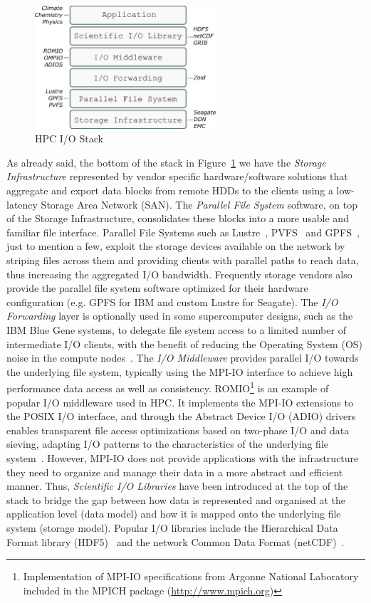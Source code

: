 \begin{figure}[!htb]
  \centering
  \includegraphics[width=0.6\textwidth]{chapters/figures/hpc-io-stack}
  \caption{HPC I/O Stack}
  \label{figure: hpc-io-stack}
\end{figure}

As already said, the bottom of the stack in Figure~\ref{figure: hpc-io-stack} we have the \textit{Storage Infrastructure} represented by vendor specific hardware/software solutions that aggregate
and export data blocks from remote HDDs to the clients using a low-latency Storage Area Network (SAN). The \textit{Parallel File System} software, on top of the Storage Infrastructure, 
consolidates these blocks into a more usable and familiar file interface. Parallel File Systems such as Lustre~\cite{Braam02}, PVFS~\cite{CarnsLRT} and GPFS~\cite{SchmuckH02}, 
just to mention a few, exploit the storage devices available on the network by striping files across them and providing clients with parallel paths to reach data, thus increasing the 
aggregated I/O bandwidth. Frequently storage vendors also provide the parallel file system software optimized for their hardware configuration (e.g. GPFS for IBM and custom Lustre for Seagate). 
The \textit{I/O Forwarding} layer is optionally used in some supercomputer designs, such as the IBM Blue Gene systems, to delegate file system access to a limited number of intermediate I/O clients, 
with the benefit of reducing the Operating System (OS) noise in the compute nodes~\cite{AliCIKLLRWS09}. The \textit{I/O Middleware} provides parallel I/O towards the underlying file system, typically 
using the MPI-IO interface to achieve high performance data access as well as consistency. ROMIO\footnote{Implementation of MPI-IO specifications from Argonne National Laboratory included in the MPICH 
package (\url{http://www.mpich.org})} is an example of popular I/O middleware used in HPC. It implements the MPI-IO extensions to the POSIX I/O interface, and through the Abstract Device I/O  (ADIO) 
drivers~\cite{ThakurGL96} enables transparent file access optimizations based on two-phase I/O and data sieving, adapting I/O patterns to the characteristics of the underlying file system~\cite{ThakurGL99}. 
However, MPI-IO does not provide applications with the infrastructure they need to organize and manage their data in a more abstract and efficient manner. Thus, \textit{Scientific I/O Libraries} have been 
introduced at the top of the stack to bridge the gap between how data is represented and organised at the application level (data model) and how it is mapped onto the underlying file system (storage model). 
Popular I/O libraries include the Hierarchical Data Format library (HDF5)~\cite{hdf5} and the network Common Data Format (netCDF)~\cite{netcdf}.

